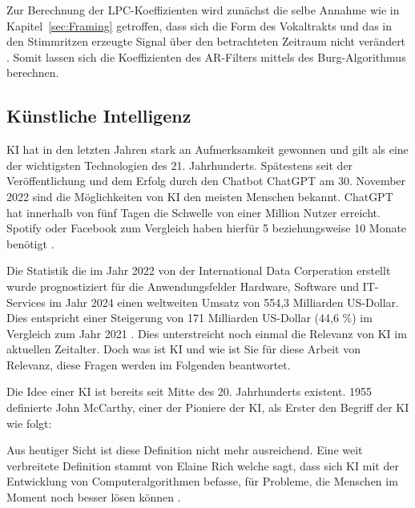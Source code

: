 Zur Berechnung der \ac{LPC}-Koeffizienten wird zunächst die selbe Annahme wie in Kapitel~\ref{sec:Framing} getroffen, dass sich die Form des Vokaltrakts und das in den Stimmritzen erzeugte Signal über den betrachteten Zeitraum nicht verändert \autocite[vgl.][S. 1304]{atal_effectiveness_1974}.
Somit lassen sich die Koeffizienten des \ac{AR}-Filters mittels des Burg-Algorithmus berechnen.

\subsection{Künstliche Intelligenz}

\textauthor{\vLB}{}{}

\ac{KI} hat in den letzten Jahren stark an Aufmerksamkeit gewonnen und gilt als eine der wichtigsten Technologien des 21. Jahrhunderts.
Spätestens seit der Veröffentlichung und dem Erfolg durch den Chatbot ChatGPT am 30. November 2022 sind die Möglichkeiten von \ac{KI} den meisten Menschen bekannt. 
ChatGPT hat innerhalb von fünf Tagen die Schwelle von einer Million Nutzer erreicht. 
Spotify oder Facebook zum Vergleich haben hierfür 5 beziehungsweise 10 Monate benötigt \autocite[vgl. ][]{janson_infografik_2023}.

Die Statistik die im Jahr 2022 von der International Data Corperation erstellt wurde prognostiziert für die Anwendungsfelder Hardware, Software und IT-Services im Jahr 2024 einen weltweiten Umsatz von 554,3 Milliarden US-Dollar.
Dies entspricht einer Steigerung von 171 Milliarden US-Dollar (44,6 \%) im Vergleich zum Jahr 2021 \autocite[vgl. ][]{idc_kunstliche_2022}.
Dies unterstreicht noch einmal die Relevanz von \ac{KI} im aktuellen Zeitalter.
Doch was ist \ac{KI} und wie ist Sie für diese Arbeit von Relevanz, diese Fragen werden im Folgenden beantwortet.

Die Idee einer \ac{KI} ist bereits seit Mitte des 20. Jahrhunderts existent. 1955 definierte John McCarthy, einer der Pioniere der \ac{KI}, als Erster den Begriff der \ac{KI} wie folgt:
\begin{quote}
  \autocite[][S. 1]{ertel_grundkurs_2016}
\end{quote}\noindent
Aus heutiger Sicht ist diese Definition nicht mehr ausreichend.
Eine weit verbreitete Definition stammt von Elaine Rich welche sagt, dass sich \ac{KI} mit der Entwicklung von Computeralgorithmen befasse, für Probleme, die Menschen im Moment noch besser lösen können \autocite[vgl. ][]{rich_artificial_1983}.

